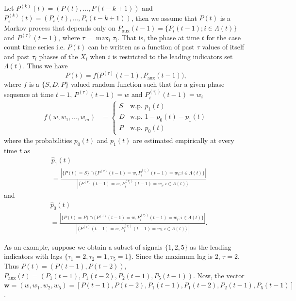 \documentclass[conference,compsoc]{IEEEtran}
\newcommand{\Paux}{P_{\textrm{aux}}}
\begin{document}
Let $ P^{(k)}(t) = (P(t), \dots, P(t-k+1))$ and $P^{(k)}_i(t) =\left(P_i(t), \dots, P_i(t-k+1)\right)$,  then we assume that $P(t)$ is a Markov process that depends only on   $\Paux(t-1) = \{\tilde P_i(t-1); i\in \Lambda(t)\}$ and $ P^{(\tau)}(t-1)$, where $\tau =\max_i \tau_i$. That is, the phase at time $t$ for the case count time series i.e. $P(t)$ can be written as a function of past $\tau$ values of itself and past $\tau_i$ phases of the $X_i$ when $i$ is restricted to the leading indicators set $\Lambda(t)$. Thus we have 
\begin{equation}
    P(t) = f\big( P^{(\tau)}(t-1), \Paux(t-1) \big),
\end{equation}
where $f$ is a $ \{S, D, P\} $ valued random function such that for a given phase sequence at time $t-1$,  $P^{(\tau)}(t-1) = w$ and $ P^{(\tau_i)}_i(t-1) =w_i$ 
\begin{align*}
    f(w, w_1, \dots, w_m) 
    &= \begin{cases}
    S & \text{w.p. } p_1(t) \\
    D& \text{w.p. } 1-p_0(t)-p_1(t)\\
    P& \text{w.p. } p_0(t) 
    \end{cases}
\end{align*}
where the probabilities $p_0(t)$ and $ p_1(t)$ are estimated empirically at every time $t$ as
{\footnotesize
\begin{align*}
    &\hat{p}_1(t) \\
    & =\frac{ |\{P(t) = S\}\cap \{P^{(\tau)}(t-1) =w, P^{(\tau_i)}_i(t-1) =w_i;i\in \Lambda(t)\} |} {| \{P^{(\tau)}(t-1) =w, P^{(\tau_i)}_i(t-1) =w_i;i\in \Lambda(t)\} |}
\end{align*} }
and 
{\footnotesize
\begin{align*}
    &\hat{p}_0(t) \\
    & =\frac{ |\{P(t) = P\}\cap \{P^{(\tau)}(t-1) =w, P^{(\tau_i)}_i(t-1) =w_i;i\in \Lambda(t)\} |} {| \{P^{(\tau)}(t-1) =w, P^{(\tau_i)}_i(t-1) =w_i;i\in \Lambda(t)\} |}.
\end{align*} }

As an example, suppose we obtain a subset of signals $\{1,2,5\}$ as the leading indicators with lags $\{\tau_1=2, \tau_2=1, \tau_5=1\}$. Since the maximum lag is 2, $\tau=2$. Thus $\tilde P(t) = (P(t-1), P(t-2))$, $\Paux(t) = (P_1(t-1), P_1(t-2), P_2(t-1), P_5(t-1))$. 
Now, the vector $\mathbf{w}=(w, w_1, w_2, w_5)=[P(t-1), P(t-2), P_1(t-1), P_1(t-2), P_2(t-1), P_5(t-1)]$. 
\end{document}
